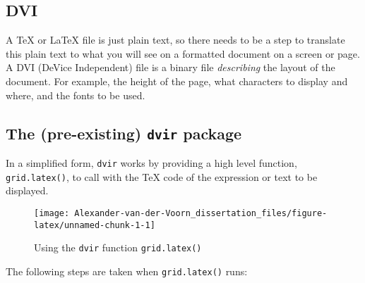 \documentclass[]{article}
\newenvironment{Shaded}{\begin{snugshade}}{\end{snugshade}}
\newcommand{\KeywordTok}[1]{\textcolor[rgb]{0.13,0.29,0.53}{\textbf{#1}}}
\newcommand{\CharTok}[1]{\textcolor[rgb]{0.31,0.60,0.02}{#1}}
\newcommand{\StringTok}[1]{\textcolor[rgb]{0.31,0.60,0.02}{#1}}
\newcommand{\NormalTok}[1]{#1}
\begin{document}
\subsection{DVI}\label{dvi}

A \TeX{} or \LaTeX{} file is just plain text, so there needs to be a
step to translate this plain text to what you will see on a formatted
document on a screen or page. A DVI (DeVice Independent) file is a
binary file \emph{describing} the layout of the document. For example,
the height of the page, what characters to display and where, and the
fonts to be used.

\subsection{\texorpdfstring{The (pre-existing) \texttt{dvir}
package}{The (pre-existing) dvir package}}\label{dvirDesc}

In a simplified form, \texttt{dvir} works by providing a high level
function, \texttt{grid.latex()}, to call with the \TeX{} code of the
expression or text to be displayed.

\begin{Shaded}
\end{Shaded}

\begin{figure}

{\centering \texttt{[image: Alexander-van-der-Voorn\_dissertation\_files/figure-latex/unnamed-chunk-1-1]} 

}

\caption{Using the \texttt{dvir} function \texttt{grid.latex()}}\label{fig:unnamed-chunk-1}
\end{figure}

The following steps are taken when \texttt{grid.latex()} runs:
\end{document}
